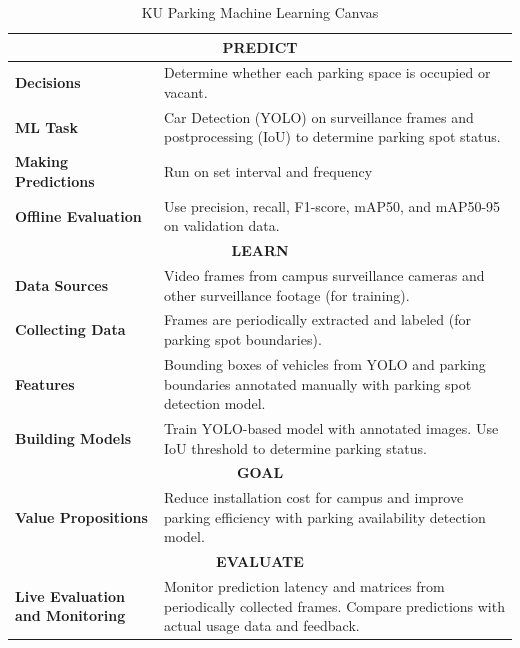\begin{table}[H]
\centering
\caption{KU Parking Machine Learning Canvas}
\label{tab:ml-canvas}
\begin{tabular}{|p{4cm}|p{10cm}|}
\hline
\multicolumn{2}{|c|}{\cellcolor{cyan!15}\textbf{PREDICT}} \\ \hline
\textbf{Decisions} & Determine whether each parking space is occupied or vacant.\\ \hline
\textbf{ML Task} & Car Detection (YOLO) on surveillance frames and postprocessing (IoU) to determine parking spot status.\\ \hline
\textbf{Making Predictions} & Run on set interval and frequency\\ \hline
\textbf{Offline Evaluation} & Use precision, recall, F1-score, mAP50, and mAP50-95 on validation data. \\ \hline

\multicolumn{2}{|c|}{\cellcolor{yellow!15}\textbf{LEARN}} \\ \hline
\textbf{Data Sources} & Video frames from campus surveillance cameras and other surveillance footage (for training). \\ \hline
\textbf{Collecting Data} & Frames are periodically extracted and labeled (for parking spot boundaries). \\ \hline
\textbf{Features} & Bounding boxes of vehicles from YOLO and parking boundaries annotated manually with parking spot detection model. \\ \hline
\textbf{Building Models} & Train YOLO-based model with annotated images. Use IoU threshold to determine parking status. \\ \hline

\multicolumn{2}{|c|}{\textbf{GOAL}} \\ \hline\textbf{Value Propositions} & Reduce installation cost for campus and improve parking efficiency with parking availability detection model. \\ \hline

\multicolumn{2}{|c|}{\cellcolor{purple!15}\textbf{EVALUATE}} \\ \hline
\textbf{Live Evaluation and Monitoring} & Monitor prediction latency and matrices from periodically collected frames. Compare predictions with actual usage data and feedback. \\ \hline

\end{tabular}
\end{table}

\clearpage
